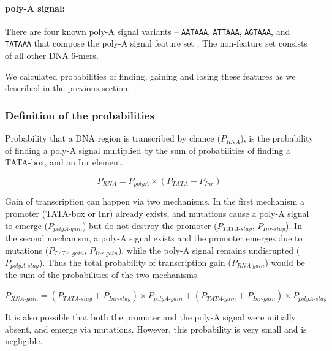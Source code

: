 \documentclass[12pt,a4paper]{article}
\begin{document}
\paragraph{poly-A signal:} There are four known poly-A signal variants -- \texttt{AATAAA}, \texttt{ATTAAA}, \texttt{AGTAAA}, and \texttt{TATAAA} that compose the poly-A signal feature set \citep{polyA}. The non-feature set consists of all other DNA 6-mers.

\vspace{1\baselineskip}

We calculated probabilities of finding, gaining and losing these features as we described in the previous section.

\subsubsection{Definition of the probabilities}

Probability that a DNA region is transcribed by chance ($P_\textit{RNA}$), is the probability of finding a poly-A signal multiplied by the sum of probabilities of finding a TATA-box, and an Inr element. 

\begin{equation}
P_\textit{RNA} = P_\textit{polyA} \times (P_\textit{TATA} + P_\textit{Inr})
\label{eqrnaprob}
\end{equation}

Gain of transcription can happen via two mechanisms. In the first mechanism a promoter (TATA-box or Inr) already exists, and mutations cause a poly-A signal to emerge ($P_\textit{polyA-gain}$) but do not destroy the promoter ($P_\textit{TATA-stay}$,  $P_\textit{Inr-stay}$). In the second mechanism, a poly-A signal exists and the promoter emerges due to mutations ($P_\textit{TATA-gain}$,  $P_\textit{Inr-gain}$), while the poly-A signal remains undisrupted ($P_\textit{polyA-stay}$). Thus the total probability of transcription gain ($P_\textit{RNA-gain}$) would be the sum of the probabilities of the two mechanisms.

\begin{equation}
P_\textit{RNA-gain} = (P_\textit{TATA-stay} + P_\textit{Inr-stay})\times P_\textit{polyA-gain} + (P_\textit{TATA-gain} + P_\textit{Inr-gain})\times P_\textit{polyA-stay}
\label{eqrnagain}
\end{equation}

It is also possible that both the promoter and the poly-A signal were initially absent, and emerge via mutations. However, this probability is very small and is negligible.
\end{document}
